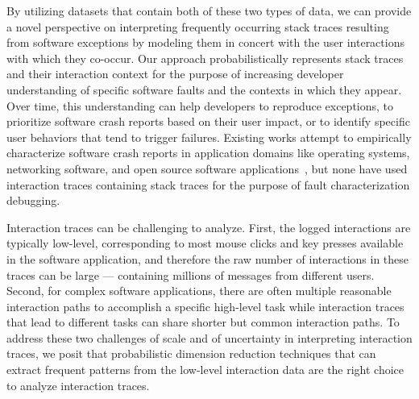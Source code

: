 By utilizing datasets that contain both of these two types of data, we can provide 
a novel perspective on interpreting frequently occurring stack traces resulting from software exceptions by
modeling them in concert with the user interactions with which they co-occur.
Our approach probabilistically represents stack traces and their interaction context
for the purpose of increasing developer understanding of specific software
faults and the contexts in which they appear. Over time, this understanding can
help developers to reproduce exceptions, to prioritize software crash reports
based on their user impact, or to identify specific user behaviors that tend to
trigger failures.  Existing works attempt to empirically characterize software
crash reports in application domains like operating systems, networking
software, and open source software
applications~\cite{Yin:2010:TUB:1823844.1823849, Chou:2001:ESO:502059.502042,
Li:2006:TCE:1181309.1181314, Lu:2008:LMC:1353535.1346323}, but none have used
interaction traces containing stack traces for the purpose of fault characterization 
debugging.


Interaction traces can be challenging to analyze. First, the logged
interactions are typically low-level, corresponding to most mouse clicks and key
presses available in the software application, and therefore the raw number of
interactions in these traces can be large --- containing millions of messages
from different users. Second, for complex software applications, there are
often multiple reasonable interaction paths to accomplish a specific high-level
task while interaction traces that lead to different tasks can share shorter
but common interaction paths.  To address these two challenges of scale and of
uncertainty in interpreting interaction traces, we posit that probabilistic
dimension reduction techniques that can extract frequent patterns from the
low-level interaction data are the right choice to analyze interaction traces.

